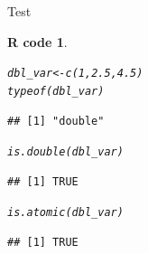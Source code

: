 \documentclass[11pt]{beamer}\usepackage[]{graphicx}\usepackage[]{color}
\makeatletter
\newcommand{\hlnum}[1]{\textcolor[rgb]{0.063,0.58,0.627}{#1}}%
\newcommand{\hlstd}[1]{\textcolor[rgb]{0.196,0.196,0.196}{#1}}%
\newcommand{\hlkwb}[1]{\textcolor[rgb]{0.627,0,0.314}{#1}}%
\newcommand{\hlkwd}[1]{\textcolor[rgb]{0.78,0.227,0.412}{#1}}%
\newenvironment{kframe}{%
 \def\at@end@of@kframe{}%
 \ifinner\ifhmode%
  \def\at@end@of@kframe{\end{minipage}}%
  \begin{minipage}{\columnwidth}%
 \fi\fi%
 \def\FrameCommand##1{\hskip\@totalleftmargin \hskip-\fboxsep
 \colorbox{shadecolor}{##1}\hskip-\fboxsep
     \hskip-\linewidth \hskip-\@totalleftmargin \hskip\columnwidth}%
 \MakeFramed {\advance\hsize-\width
   \@totalleftmargin\z@ \linewidth\hsize
   \@setminipage}}%
 {\par\unskip\endMakeFramed%
 \at@end@of@kframe}
\newenvironment{knitrout}{}{} %
\newtheorem{rcode}{R code}[section]
\makeatother
\begin{document}
\begin{frame}[fragile]{Test}

\begin{knitrout}
\color{fgcolor}\begin{kframe}
\begin{rcode}\label{unnamed-chunk-15}\begin{alltt}
\hlstd{dbl_var} \hlkwb{<-} \hlkwd{c}\hlstd{(}\hlnum{1}\hlstd{,} \hlnum{2.5}\hlstd{,} \hlnum{4.5}\hlstd{)}
\hlkwd{typeof}\hlstd{(dbl_var)}
\end{alltt}
\begin{verbatim}
## [1] "double"
\end{verbatim}
\begin{alltt}
\hlkwd{is.double}\hlstd{(dbl_var)}
\end{alltt}
\begin{verbatim}
## [1] TRUE
\end{verbatim}
\begin{alltt}
\hlkwd{is.atomic}\hlstd{(dbl_var)}
\end{alltt}
\begin{verbatim}
## [1] TRUE
\end{verbatim}
\end{rcode}\end{kframe}
\end{knitrout}

\end{frame}
\end{document}
